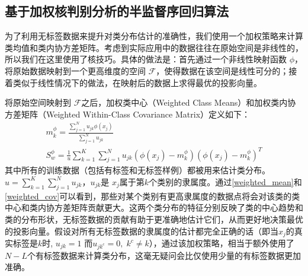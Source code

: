 \subsection{基于加权核判别分析的半监督序回归算法}
为了利用无标签数据来提升对类分布估计的准确性，我们使用一个加权策略来计算类均值和类内协方差矩阵。考虑到实际应用中的数据往往在原始空间是非线性的，所以我们在这里使用了核技巧。具体的做法是：首先通过一个非线性映射函数 \(\phi\)，将原始数据映射到一个更高维度的空间 \(\mathcal{F}\)，使得数据在该空间是线性可分的；接着类似于线性情况下的做法，在映射后的数据上求得最优的投影向量。

将原始空间映射到 \(\mathcal{F}\)之后，加权类中心（Weighted Class Means）和加权类内协方差矩阵（Weighted Within-Class Covariance Matrix）定义如下：
\begin{gather}
\label{weighted_mean}
m^{\phi}_{k}=\frac{\sum_{j=1}^{N} u_{jk}\phi(x_{j})}{\sum_{j=1}^{N} u_{jk}} \\
\label{weighted_cov}
S^{\phi}_{w}=\frac{1}{u} \sum_{k=1}^{K} \sum_{j=1}^{N} u_{jk}(\phi(x_{j})-m^{\phi}_{k})(\phi(x_{j})-m^{\phi}_{k})^{T}
\end{gather}
其中所有的训练数据（包括有标签和无标签样例）都被用来估计类分布。 \(u=\sum_{k=1}^{K} \sum_{j=1}^{N} u_{jk}\)，\(u_{jk}\)是 \(x_{j}\)属于第\(k\)个类别的隶属度。通过\autoref{weighted_mean}和\autoref{weighted_cov}可以看到，那些对某个类别有更高隶属度的数据点将会对该类的类中心和类内协方差矩阵贡献更大。这两个类分布的特征分别反映了类的中心趋势和类的分布形状，无标签数据的贡献有助于更准确地估计它们，从而更好地决策最优的投影向量。假设对所有无标签数据的隶属度的估计都完全正确的话（即当\(x_{j}\)的真实标签是\(k\)时, \(u_{jk}=1\) 而\(u_{jk^{c}}=0,\;k^{c}\neq k\)），通过该加权策略，相当于额外使用了\(N-L\)个有标签数据来计算类分布，这毫无疑问会比仅使用少量的有标签数据更加准确。

